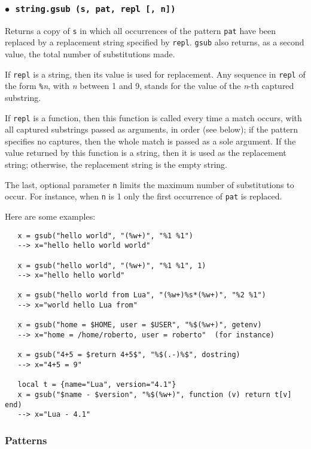 \documentclass[11pt,twoside,draft]{article}
\makeatletter
\newcommand{\M}[1]{{\rm\emph{#1}}}
\newcommand{\T}[1]{{\tt #1}}
\newcommand{\DefLIB}[1]{\index{#1@{\tt #1}}}
\newcommand{\ff}{$\bullet$\ }
\makeatother
\begin{document}

\subsubsection*{\ff \T{string.gsub (s, pat, repl [, n])}}
\DefLIB{string.gsub}
Returns a copy of \verb|s|
in which all occurrences of the pattern \verb|pat| have been
replaced by a replacement string specified by \verb|repl|.
\verb|gsub| also returns, as a second value,
the total number of substitutions made.

If \verb|repl| is a string, then its value is used for replacement.
Any sequence in \verb|repl| of the form \verb|%|\M{n},
with \M{n} between 1 and 9,
stands for the value of the \M{n}-th captured substring.

If \verb|repl| is a function, then this function is called every time a
match occurs, with all captured substrings passed as arguments,
in order (see below);
if the pattern specifies no captures,
then the whole match is passed as a sole argument.
If the value returned by this function is a string,
then it is used as the replacement string;
otherwise, the replacement string is the empty string.

The last, optional parameter \verb|n| limits
the maximum number of substitutions to occur.
For instance, when \verb|n| is 1 only the first occurrence of
\verb|pat| is replaced.

Here are some examples:
\begin{verbatim}
   x = gsub("hello world", "(%w+)", "%1 %1")
   --> x="hello hello world world"

   x = gsub("hello world", "(%w+)", "%1 %1", 1)
   --> x="hello hello world"

   x = gsub("hello world from Lua", "(%w+)%s*(%w+)", "%2 %1")
   --> x="world hello Lua from"

   x = gsub("home = $HOME, user = $USER", "%$(%w+)", getenv)
   --> x="home = /home/roberto, user = roberto"  (for instance)

   x = gsub("4+5 = $return 4+5$", "%$(.-)%$", dostring)
   --> x="4+5 = 9"

   local t = {name="Lua", version="4.1"}
   x = gsub("$name - $version", "%$(%w+)", function (v) return t[v] end)
   --> x="Lua - 4.1"
\end{verbatim}


\subsubsection*{Patterns} \label{pm}
\end{document}
